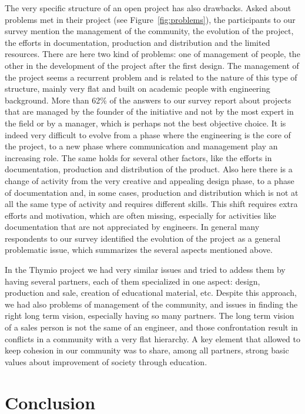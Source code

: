 \documentclass[letterpaper, 10 pt, conference]{ieeeconf}  %
\begin{document}
The very specific structure of an open project has also drawbacks. 
Asked about problems met in their project (see Figure~\ref{fig:problems}), the participants to our survey mention the management of the community, the evolution of the project, the efforts in documentation, production and distribution and the limited resources.
There are here two kind of problems: one of management of people, the other in the development of the project after the first design.
The management of the project seems a recurrent problem and is related to the nature of this type of structure, mainly very flat and built on academic people with engineering background. 
More than 62\% of the answers to our survey report about projects that are managed by the founder of the initiative and not by the most expert in the field or by a manager, which is perhaps not the best objective choice.
It is indeed very difficult to evolve from a phase where the engineering is the core of the project, to a new phase where communication and management play an increasing role.
The same holds for several other factors, like the efforts in documentation, production and distribution of the product. 
Also here there is a change of activity from the very creative and appealing design phase, to a phase of documentation and, in some cases, production and distribution which is not at all the same type of activity and requires different skills.
This shift requires extra efforts and motivation, which are often missing, especially for activities like documentation that are not appreciated by engineers.
In general many respondents to our survey identified the evolution of the project as a general problematic issue, which summarizes the several aspects mentioned above.

In the Thymio project we had very similar issues and tried to addess them by having several partners, each of them specialized in one aspect: design, production and sale, creation of educational material, etc.
Despite this approach, we had also problems of management of the community, and issues in finding the right long term vision, especially having so many partners. 
The long term vision of a sales person is not the same of an engineer, and those confrontation result in conflicts in a community with a very flat hierarchy. 
A key element that allowed to keep cohesion in our community was to share, among all partners, strong basic values about improvement of society through education.


\section{Conclusion}
\end{document}
